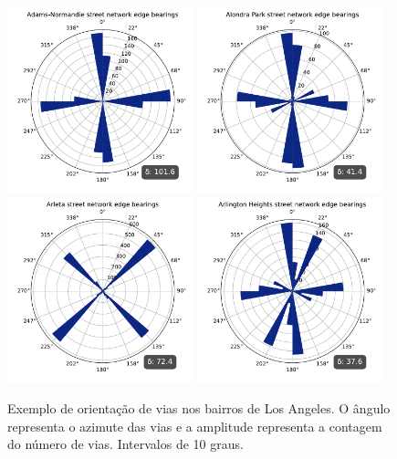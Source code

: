 \begin{figure}[H]
    \centering
    \caption{Exemplo de orientação de vias nos bairros de Los Angeles. O ângulo representa o azimute das vias e a amplitude representa a contagem do número de vias. Intervalos de 10 graus.} \label{fig:OrientacaoLosAngeles}
    \includegraphics[width=0.48\textwidth]{images/6_amazon/orientacao/172 - polar_hist_street_orientation_Adams-Normandie.pdf}
    \includegraphics[width=0.48\textwidth]{images/6_amazon/orientacao/115 - polar_hist_street_orientation_Alondra Park.pdf}
    \includegraphics[width=0.48\textwidth]{images/6_amazon/orientacao/155 - polar_hist_street_orientation_Arleta.pdf}
    \includegraphics[width=0.48\textwidth]{images/6_amazon/orientacao/104 - polar_hist_street_orientation_Arlington Heights.pdf}

\end{figure}
